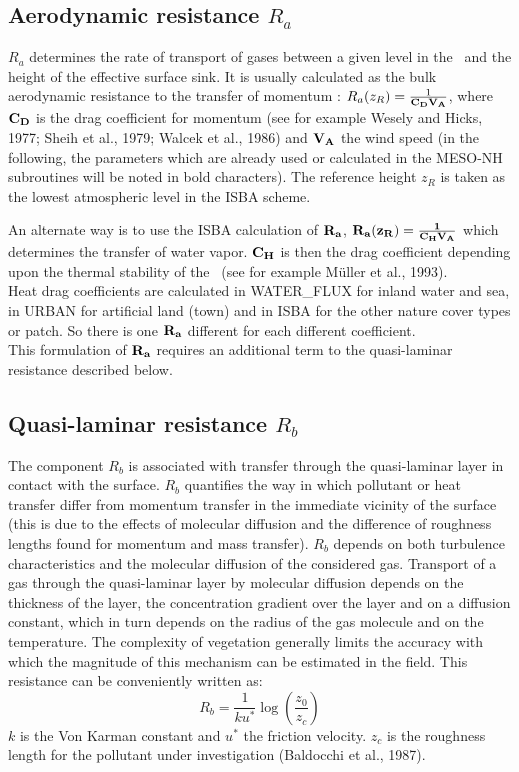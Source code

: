 
\subsection{Aerodynamic resistance $R_a$}

$R_a$ determines the rate of transport of gases between a given level in the
\atm~and the height of the effective surface sink. 
It is usually calculated as the bulk aerodynamic resistance to the transfer of
momentum :  $R_a(z_R)=\frac{1}{\bf{C_D} \bf{V_A}}$, where $\bf{C_D}$ is the drag
coefficient for momentum (see for example Wesely and Hicks, 1977; Sheih et al., 1979;
Walcek et al., 1986)
and $\bf{V_A}$ the wind speed (in the following, the parameters which are
already used or calculated in the MESO-NH subroutines will be noted in bold
characters).
The reference height $z_R$ is taken as the lowest atmospheric level in
the ISBA scheme.
\medskip

An alternate way is to use the ISBA calculation of $\bf {R_a}$,
$\bf{R_a(z_R)}=\frac{1}{\bf{C_H} \bf{V_A}}$ 
which determines the transfer of water
vapor. $\bf{C_H}$ is then the drag coefficient depending upon the thermal
stability of the \atm~(see for example M\"uller et al., 1993).  \\
Heat drag coefficients are calculated in WATER\_FLUX for inland water
and sea, in URBAN for artificial land (town) and in ISBA for the other 
nature cover types or patch. So there is one $\bf {R_a}$ different for
each different coefficient.
\\
This formulation of $\bf {R_a}$ requires an additional term to the
quasi-laminar resistance described below.
\subsection{Quasi-laminar resistance $R_b$}

The component $R_b$ is associated with transfer through the quasi-laminar 
layer in contact with the surface. $R_b$ quantifies the way in which pollutant
or heat transfer differ from momentum transfer in the immediate vicinity of the
surface (this is due to the effects of molecular diffusion and the difference 
of roughness lengths found for momentum and mass transfer). 
$R_b$ depends on both turbulence characteristics and the molecular
diffusion of the considered gas. Transport of a gas through the
quasi-laminar layer by molecular diffusion depends on the thickness of the
layer, the concentration gradient over the layer and on a diffusion constant,
which in turn depends on the radius of the gas molecule and on the temperature.
The complexity of vegetation generally limits the accuracy with which the
magnitude of this mechanism can be estimated in the field. This resistance can
be conveniently written as:
\[ R_b=\frac{1}{k u^*} \log (\frac{z_0}{z_c})\]
$k$ is the Von Karman constant and $u^*$ the friction velocity.
$z_c$ is the roughness length for the pollutant under investigation (Baldocchi
et al., 1987). 

